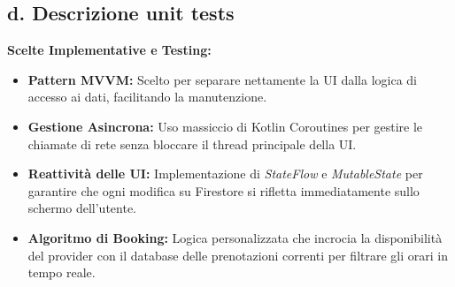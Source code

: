 \documentclass[12pt]{article}
\begin{document}
\subsection{d. Descrizione unit tests}
\textbf{Scelte Implementative e Testing:}
\begin{itemize}
    \item \textbf{Pattern MVVM:} Scelto per separare nettamente la UI dalla logica di accesso ai dati, facilitando la manutenzione.
    \item \textbf{Gestione Asincrona:} Uso massiccio di Kotlin Coroutines per gestire le chiamate di rete senza bloccare il thread principale della UI.
    \item \textbf{Reattività delle UI:} Implementazione di \textit{StateFlow} e \textit{MutableState} per garantire che ogni modifica su Firestore si rifletta immediatamente sullo schermo dell'utente.
    \item \textbf{Algoritmo di Booking:} Logica personalizzata che incrocia la disponibilità del provider con il database delle prenotazioni correnti per filtrare gli orari in tempo reale.
\end{itemize}
\end{document}
